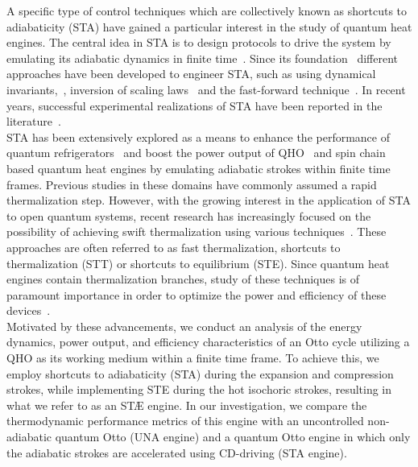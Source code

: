 \documentclass[aps,pra,twocolumn,showpacs,showkeys,groupedaddress,nobalancelastpage,nofootinbib,floatfix,superscriptaddress,longbibliography]{revtex4-2}
\begin{document}
A specific type of control techniques which are collectively known as shortcuts to adiabaticity (STA) have gained a particular interest in the study of quantum heat engines. The central idea in STA is to design protocols to drive the system by emulating its adiabatic dynamics in finite time~\cite{TORRONTEGUI2013117,RevModPhys.91.045001}. Since its foundation~\cite{doi:10.1021/jp030708a,doi:10.1021/jp040647w,Berry_2009,PhysRevLett.104.063002} different approaches have been developed to engineer STA, such as using dynamical invariants,~\cite{PhysRevLett.104.063002,PhysRevA.83.062116}, inversion of scaling laws~\cite{PhysRevA.84.031606,Campo2012} and the fast-forward technique~\cite{doi:10.1098/rspa.2009.0446,PhysRevA.84.043434,PhysRevA.86.013601}. In recent years, successful experimental realizations of STA have been reported in the literature~\cite{doi:10.1126/sciadv.aau5999,https://doi.org/10.1002/qute.201900121,PhysRevApplied.13.044059,Yin2022}.\\

STA has been extensively explored as a means to enhance the performance of quantum refrigerators~\cite{PhysRevB.100.035407,PhysRevResearch.2.023120} and boost the power output of QHO~\cite{Campo2014,PhysRevE.98.032121,PhysRevE.99.022110,e18050168} and spin chain~\cite{PhysRevE.99.032108,PhysRevResearch.2.023145,_AKMAK_2021} based quantum heat engines by emulating adiabatic strokes within finite time frames. Previous studies in these domains have commonly assumed a rapid thermalization step. However, with the growing interest in the application of STA to open quantum systems, recent research has increasingly focused on the possibility of achieving swift thermalization using various techniques~\cite{PhysRevA.98.052129,PhysRevLett.122.250402,PhysRevA.100.012126,Alipour2020shortcutsto,PhysRevResearch.2.033178,PhysRevX.10.031015,Suri2018,Dann_2020}. These approaches are often referred to as fast thermalization, shortcuts to thermalization (STT) or shortcuts to equilibrium (STE). Since quantum heat engines contain thermalization branches, study of these techniques is of paramount importance in order to optimize the power and efficiency of these devices~\cite{PhysRevA.100.012126,PhysRevX.10.031015,Suri2018,Dann_2020,delCampo2018}.\\

Motivated by these advancements, we conduct an analysis of the energy dynamics, power output, and efficiency characteristics of an Otto cycle utilizing a QHO as its working medium within a finite time frame. To achieve this, we employ shortcuts to adiabaticity (STA) during the expansion and compression strokes, while implementing STE during the hot isochoric strokes, resulting in what we refer to as an ST{\AE} engine. In our investigation, we compare the thermodynamic performance metrics of this engine with an uncontrolled non-adiabatic quantum Otto (UNA engine) and a quantum Otto engine in which only the adiabatic strokes are accelerated using CD-driving (STA engine).\\
\end{document}
